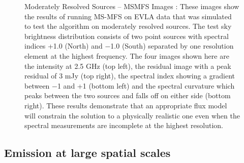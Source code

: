 \documentclass[structabstract]{stylefiles/aa}
\begin{document}




\begin{figure}[t!]
\begin{center}
\end{center}
\begin{center}
\end{center}
\caption[Moderately Resolved Sources : MSMFS Images]
{\small Moderately Resolved Sources -- MSMFS Images : 
These images show the results of running MS-MFS
on EVLA data that was simulated to test the 
algorithm on moderately resolved sources. 
The test sky brightness distribution consists of two point sources 
with spectral indices +1.0 (North) and $-$1.0 (South) separated by one
resolution element at the highest frequency.
The four images shown here are the intensity at 2.5 GHz (top left),
the residual image with a peak residual of 3 mJy (top right),    
the spectral index showing a gradient between $-$1 and +1 (bottom left)
and the spectral curvature which peaks between the
two sources and falls off on either side (bottom right). These results
demonstrate that an appropriate flux model will constrain the solution to a physically
realistic one even when the spectral measurements are incomplete
at the highest resolution. 
}
\label{Fig:modres_msmfs}
\end{figure}




\subsection{Emission at large spatial scales}
\end{document}
